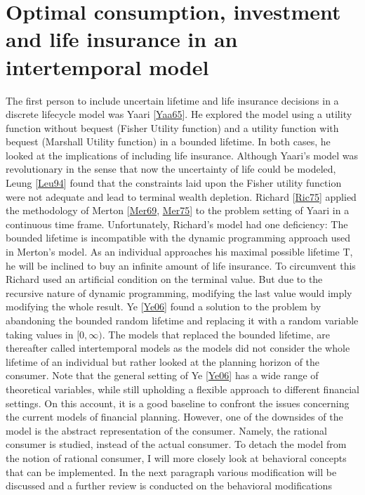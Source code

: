 \documentclass[letterpaper,10pt,english]{jupyterBook}
\begin{document}
\section{Optimal consumption, investment and life insurance in an intertemporal model}
\label{\detokenize{Financial_application:optimal-consumption-investment-and-life-insurance-in-an-intertemporal-model}}
\sphinxAtStartPar
The first person to include uncertain lifetime and life insurance decisions in a discrete life\sphinxhyphen{}cycle model was Yaari {[}\hyperlink{cite.Discussion:id2}{Yaa65}{]}. He explored the model using a utility function without bequest (Fisher Utility function) and a utility function with bequest (Marshall Utility function) in a bounded lifetime. In both cases, he looked at the implications of including life insurance. Although Yaari’s model was revolutionary in the sense that now the uncertainty of life could be modeled, Leung {[}\hyperlink{cite.Discussion:id6}{Leu94}{]} found that the constraints laid upon the Fisher utility function were not adequate and lead to terminal wealth depletion. Richard {[}\hyperlink{cite.Discussion:id5}{Ric75}{]} applied the methodology of Merton {[}\hyperlink{cite.Discussion:id3}{Mer69}, \hyperlink{cite.Discussion:id4}{Mer75}{]} to the problem setting of Yaari in a continuous time frame. Unfortunately, Richard’s model had one deficiency: The bounded lifetime is incompatible with the dynamic programming approach used in Merton’s model. As an individual approaches his maximal possible lifetime T, he will be inclined to buy an infinite amount of life insurance. To circumvent this Richard used an artificial condition on the terminal value. But due to the recursive nature of dynamic programming, modifying the last value would imply modifying the whole result. Ye {[}\hyperlink{cite.Discussion:id8}{Ye06}{]}  found a solution to the problem by abandoning the bounded random lifetime and replacing it with a random variable taking values in \([0,\infty)\). The models that replaced the bounded lifetime, are thereafter called intertemporal models as the models did not consider the whole lifetime of an individual but rather looked at the planning horizon of the consumer.  Note that the general setting of Ye {[}\hyperlink{cite.Discussion:id8}{Ye06}{]} has a wide range of theoretical variables, while still upholding a flexible approach to different financial settings. On this account, it is a good baseline to confront the issues concerning the current models of financial planning. However, one of the downsides of the model is the abstract representation of the consumer. Namely, the rational consumer is studied, instead of the actual consumer. To detach the model from the notion of rational consumer, I will more closely look at behavioral concepts that can be implemented. In the next paragraph various modification will be discussed and a further review is conducted on the behavioral modifications
\end{document}
